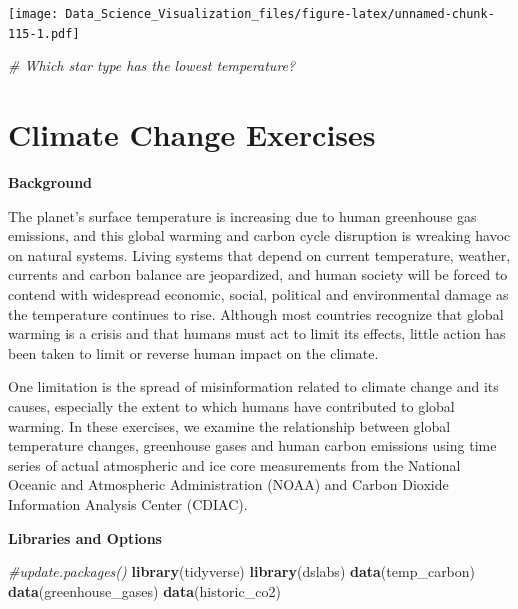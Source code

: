 \documentclass[
]{article}
\newenvironment{Shaded}{\begin{snugshade}}{\end{snugshade}}
\newcommand{\CommentTok}[1]{\textcolor[rgb]{0.56,0.35,0.01}{\textit{#1}}}
\newcommand{\KeywordTok}[1]{\textcolor[rgb]{0.13,0.29,0.53}{\textbf{#1}}}
\newcommand{\NormalTok}[1]{#1}
\begin{document}
\texttt{[image: Data\_Science\_Visualization\_files/figure-latex/unnamed-chunk-115-1.pdf]}

\begin{Shaded}
\begin{Highlighting}[]
\CommentTok{# Which star type has the lowest temperature?}
\end{Highlighting}
\end{Shaded}

\hypertarget{climate-change-exercises}{%
\section{Climate Change Exercises}\label{climate-change-exercises}}

\textbf{Background}

The planet's surface temperature is increasing due to human greenhouse
gas emissions, and this global warming and carbon cycle disruption is
wreaking havoc on natural systems. Living systems that depend on current
temperature, weather, currents and carbon balance are jeopardized, and
human society will be forced to contend with widespread economic,
social, political and environmental damage as the temperature continues
to rise. Although most countries recognize that global warming is a
crisis and that humans must act to limit its effects, little action has
been taken to limit or reverse human impact on the climate.

One limitation is the spread of misinformation related to climate change
and its causes, especially the extent to which humans have contributed
to global warming. In these exercises, we examine the relationship
between global temperature changes, greenhouse gases and human carbon
emissions using time series of actual atmospheric and ice core
measurements from the National Oceanic and Atmospheric Administration
(NOAA) and Carbon Dioxide Information Analysis Center (CDIAC).

\textbf{Libraries and Options}

\begin{Shaded}
\begin{Highlighting}[]
\CommentTok{#update.packages()}
\KeywordTok{library}\NormalTok{(tidyverse)}
\KeywordTok{library}\NormalTok{(dslabs)}
\KeywordTok{data}\NormalTok{(temp_carbon)}
\KeywordTok{data}\NormalTok{(greenhouse_gases)}
\KeywordTok{data}\NormalTok{(historic_co2)}
\end{Highlighting}
\end{Shaded}
\end{document}
